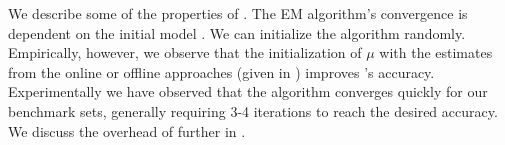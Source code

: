 We describe some of the properties of \SYSTEMLEO{}. The EM algorithm's
convergence is dependent on the initial model
\cite{wu1983convergence}.  We can initialize the algorithm randomly.
Empirically, however, we observe that the initialization of $\mu$ with
the estimates from the online or offline approaches (given in
) improves \SYSTEMLEO{}'s accuracy.  Experimentally we
have observed that the algorithm converges quickly for our benchmark
sets, generally requiring 3-4 iterations to reach the desired
accuracy. We discuss the overhead of \SYSTEMLEO{} further in
. 
